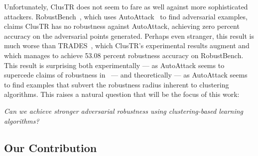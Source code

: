 Unfortunately, ClusTR does not seem to fare as well against more sophisticated attackers. RobustBench~\cite{Croce2020RobustBench}, which uses AutoAttack~\cite{Croce2020AutoAttack} to find adversarial examples, claims ClusTR has no robustness against AutoAttack, achieving zero percent accuracy on the adversarial points generated. Perhaps even stranger, this result is much worse than TRADES~\cite{Zhang2019TRADES}, which ClusTR's experimental results augment and which manages to achieve 53.08 percent robustness accuracy on RobustBench. This result is surprising both experimentally — as AutoAttack seems to supercede claims of robustness in~\cite{Alfarra2020ClusTR} — and theoretically — as AutoAttack seems to find examples that subvert the robustness radius inherent to clustering algorithms. This raises a natural question that will be the focus of this work:
\begin{center}
    \emph{Can we achieve stronger adversarial robustness using clustering-based learning algorithms?}
\end{center}

\subsection{Our Contribution}


